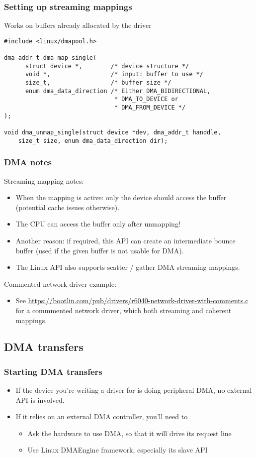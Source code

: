 \begin{frame}[fragile]
  \frametitle{Setting up streaming mappings}
  Works on buffers already allocated by the driver
\begin{verbatim}
#include <linux/dmapool.h>

dma_addr_t dma_map_single(
      struct device *,        /* device structure */
      void *,                 /* input: buffer to use */
      size_t,                 /* buffer size */
      enum dma_data_direction /* Either DMA_BIDIRECTIONAL,
                               * DMA_TO_DEVICE or
                               * DMA_FROM_DEVICE */
);

void dma_unmap_single(struct device *dev, dma_addr_t handdle,
    size_t size, enum dma_data_direction dir);
\end{verbatim}
\end{frame}

\begin{frame}
  \frametitle{DMA notes}
  Streaming mapping notes:
  \begin{itemize}
  \item When the mapping is active: only the device should access the
    buffer (potential cache issues otherwise).
  \item The CPU can access the buffer only after unmapping!
  \item Another reason: if required, this API can create an
    intermediate bounce buffer (used if the given buffer is not usable
    for DMA).
  \item The Linux API also supports scatter / gather DMA streaming
    mappings.
  \end{itemize}
  Commented network driver example:
  \begin{itemize}
    \item See {\small \url{https://bootlin.com/pub/drivers/r6040-network-driver-with-comments.c}}
    for a commmented network driver, which both streaming and coherent
    mappings.
  \end{itemize}
\end{frame}

\subsection{DMA transfers}

\begin{frame}
  \frametitle{Starting DMA transfers}
  \begin{itemize}
  \item If the device you're writing a driver for is doing peripheral
    DMA, no external API is involved.
  \item If it relies on an external DMA controller, you'll need to
    \begin{itemize}
    \item Ask the hardware to use DMA, so that it will drive its
      request line
    \item Use Linux DMAEngine framework, especially its slave API
    \end{itemize}
  \end{itemize}
\end{frame}

